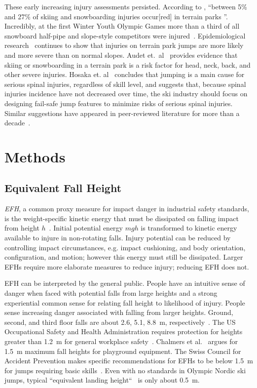 \documentclass[smallextended]{svjour3}       %
\begin{document}
These early increasing injury assessments persisted. According to
\cite{Russell2014}, ``between 5\% and 27\% of skiing and snowboarding injuries
occur[red] in terrain parks
\cite{Bridges2003,Goulet2007,Moffat2009,Greve2009,Brooks2010,Ruedl2013}''.
Incredibly, at the first Winter Youth Olympic Games more than a third of all
snowboard half-pipe and slope-style competitors were injured~\cite{Ruedl2012}.
Epidemiological research~\cite{Carus2016,Audet2020,Hosaka2020} continues to
show that injuries on terrain park jumps are more likely and more severe than
on normal slopes. Audet et.~al~\cite{Audet2020} provides evidence that skiing
or snowboarding in a terrain park is a risk factor for head, neck, back, and
other severe injuries. Hosaka et. al~\cite{Hosaka2020} concludes that jumping
is a main cause for serious spinal injuries, regardless of skill level, and
suggests that, because spinal injuries incidence  have not decreased over time,
the ski industry should focus on designing fail-safe jump features to minimize
risks of serious spinal injuries. Similar suggestions have appeared in
peer-reviewed literature for more than a
decade~\cite{Hubbard2009,Swedberg2012,Hubbard2012,McNeil2012,McNeil2012a,Hubbard2015,Levy2015,Petrone2017,Moore2018}.

\section{Methods}
\subsection{Equivalent Fall Height}
\label{sec:efh}
%
\emph{EFH}, a common proxy measure for impact danger in industrial safety
standards, is the weight-specific kinetic energy that must be dissipated on
falling impact from height $h$~\cite{Muller1995,Hubbard2009,Gasser2018}.
Initial potential energy $mgh$ is transformed to kinetic energy available to
injure in non-rotating falls. Injury potential can be reduced by controlling
impact circumstances, e.g. impact cushioning, and body orientation,
configuration, and motion; however this energy must still be dissipated. Larger
EFHs require more elaborate measures to reduce injury; reducing EFH does not.

EFH can be interpreted by the general public. People have an intuitive sense of
danger when faced with potential falls from large heights and a strong
experiential common sense for relating fall height to likelihood of injury.
People sense increasing danger associated with falling from larger heights.
Ground, second, and third floor falls are about 2.6, 5.1, 8.8~\si{\meter},
respectively~\cite{Vish2005}. The US Occupational Safety and Health
Administration requires protection for heights greater than 1.2~\si{\meter} for
general workplace safety~\cite{OSHA2021}.  Chalmers et al.~\cite{Chalmers1996}
argues for 1.5~\si{\meter} maximum fall heights for playground equipment. The
Swiss Council for Accident Prevention makes specific recommendations for EFHs
to be below 1.5~\si{\meter} for jumps requiring basic skills~\cite{Heer2019}.
Even with no standards in Olympic Nordic ski jumps, typical ``equivalent
landing height``~\cite{Gasser2018} is only about 0.5~\si{\meter}.
\end{document}
